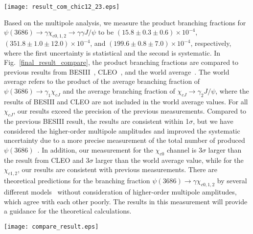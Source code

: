 \documentclass[prd,twocolumn,showpacs,amsmath,amssymb]{revtex4-1}
\begin{document}
\begin{figure*}[!htpb]
  \centering
    \texttt{[image: result\_com\_chic12\_23.eps]}
  \caption{Normalized M2 and E3 amplitudes from this analysis compared with previous experimental results and theoretical predictions~\cite{M2_theory4} with $m_{c} = 1.5$~GeV/$c^2$ and $\kappa = 0$. The $y$ axis shows the number of signal events of each experiment. *Measured by the process of $\psi(3686)\to\gamma\chi_{c2}$ with $\chi_{c2}\to\pi^+\pi^-/K^+K^-$.}
  \label{com_chic12} %
\end{figure*}

Based on the multipole analysis, we measure the product branching fractions for $\psi(3686)\rightarrow\gamma\chi_{c0,1,2}\to\gamma\gamma J/\psi$ to be $(15.8\pm0.3\pm0.6)\times 10^{-4}$, $(351.8\pm1.0\pm12.0)\times 10^{-4}$, and $(199.6\pm0.8\pm7.0)\times 10^{-4}$, respectively, where the first uncertainty is statistical and the second is systematic. In Fig.~\ref{final_result_compare}, the product branching fractions are compared to previous results from BESIII~\cite{BESIII_chicj}, CLEO~\cite{CLEO_chicj}, and the world average~\cite{PDG}. The world average refers to the product of the average branching fraction of $\psi(3686)\rightarrow\gamma_{1}\chi_{cJ}$ and the average branching fraction of $\chi_{cJ}\rightarrow\gamma_{2} J/\psi$, where the results of BESIII and CLEO are not included in the world average values. For all $\chi_{cJ}$, our results exceed the precision of the previous measurements. Compared to the previous BESIII result, the results are consistent within 1$\sigma$, but we have considered the higher-order multipole amplitudes and improved the systematic uncertainty due to a more precise measurement of the total number of produced $\psi(3686)$~\cite{psip_N}. In addition, our measurement for the $\chi_{c0}$ channel is 3$\sigma$ larger than the result from CLEO and 3$\sigma$ larger than the world average value, while for the $\chi_{c1,2}$, our results are consistent with previous measurements.
There are theoretical predictions for the branching fraction $\psi(3686)\to \gamma\chi_{c0,1,2}$ by several different models~\cite{QM_1,QM_chi1,Theory_1} without consideration of higher-order multipole amplitudes, which agree with each other poorly.
The results in this measurement will provide a guidance for the theoretical calculations.

\begin{figure*}[!htbp]
  \centering
  \texttt{[image: compare\_result.eps]}\\
  \caption{Comparison of the product branching fraction $\mathcal{B}(\psi(3686)\rightarrow\gamma_1 \chi_{cJ})\times\mathcal{B}(\chi_{cJ}\rightarrow\gamma_2 J/\psi)$ with previously published measurements. *The average "Ave" is the product between the individual world average of $\mathcal{B}(\psi(3686)\rightarrow\gamma_1 \chi_{cJ})$~\cite{PDG} and  $\mathcal{B}(\chi_{cJ}\rightarrow\gamma_2 J/\psi)$~\cite{PDG}.}
  \label{final_result_compare}
\end{figure*}
\end{document}
